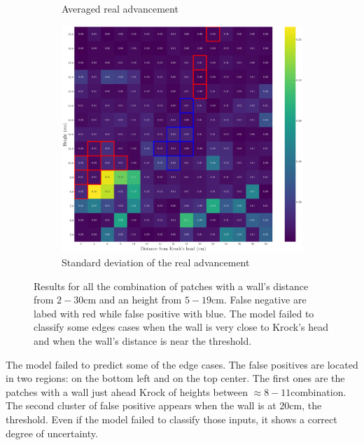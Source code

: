\documentclass[../document.tex]{subfiles}
\begin{document}
\begin{figure}[htbp]
\begin{subfigure}[b]{0.48\linewidth}
        \caption{Averaged real advancement}
    \end{subfigure}   
    \begin{subfigure}[b]{0.48\linewidth}
        \includegraphics[width=\linewidth]{../img/5/custom_patches/walls_heights/walls_heights_std.png}
        \caption{Standard deviation of the real advancement}
    \end{subfigure}   
\caption{Results for all the combination of patches with a wall's distance from $2-30$cm and an height from $5 - 19$cm. False negative are labed with red while false positive with blue. The model failed to classify some edges cases when the wall is very close to Krock's head and when the wall's distance is near the threshold.}    
\end{figure}
The model failed to predict some of the edge cases. The false positives are located in two regions: on the bottom left and on the top center. The first ones are the patches with a wall just ahead Krock of heights between $\approx 8 - 11$combination. The second cluster of false positive appears when the wall is at $20$cm, the threshold. Even if the model failed to classify those inputs, it shows a correct degree of uncertainty.
\end{document}
